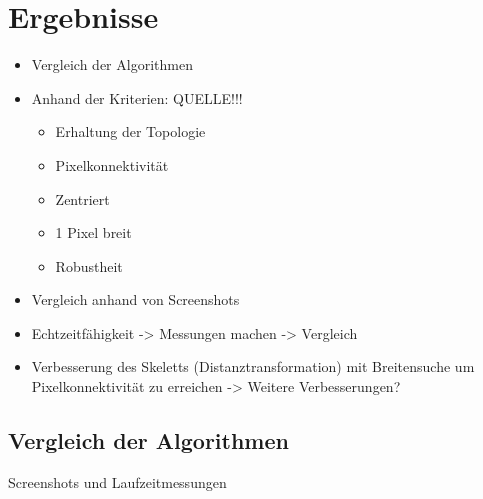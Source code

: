 \chapter{Ergebnisse}
\begin{itemize}
	\item Vergleich der Algorithmen
	\item Anhand der Kriterien: QUELLE!!!
	\begin{itemize}
		\item Erhaltung der Topologie
		\item Pixelkonnektivität
		\item Zentriert
		\item 1 Pixel breit
		\item Robustheit
	\end{itemize}
	\item Vergleich anhand von Screenshots
	\item Echtzeitfähigkeit -> Messungen machen -> Vergleich
	\item Verbesserung des Skeletts (Distanztransformation) mit Breitensuche um Pixelkonnektivität zu erreichen -> Weitere Verbesserungen?
\end{itemize}
\section{Vergleich der Algorithmen}
Screenshots und Laufzeitmessungen
